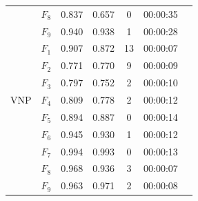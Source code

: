 \documentclass[main.tex]{subfiles}
\begin{document}
\begin{table}
\begin{center}
\begin{tabular}{ |c|c|c|c|c|c|c| }
& $F_{8}$ & 0.837 & 0.657 & 0 & 00:00:35 \\
& $F_{9}$ & 0.940 & 0.938 & 1 & 00:00:28 \\
\hline
\multirow{7}{*}{VNP} 
& $F_{1}$ & 0.907 & 0.872 & 13 & 00:00:07 \\
& $F_{2}$ & 0.771 & 0.770 & 9 & 00:00:09 \\
& $F_{3}$ & 0.797 & 0.752 & 2 & 00:00:10 \\
& $F_{4}$ & 0.809 & 0.778 & 2 & 00:00:12 \\
& $F_{5}$ & 0.894 & 0.887 & 0 & 00:00:14 \\
& $F_{6}$ & 0.945 & 0.930 & 1 & 00:00:12 \\
& $F_{7}$ & 0.994 & 0.993 & 0 & 00:00:13 \\
& $F_{8}$ & 0.968 & 0.936 & 3 & 00:00:07 \\
& $F_{9}$ & 0.963 & 0.971 & 2 & 00:00:08 \\
\hline
\end{tabular}
\end{center}
\end{table}
\fi 
\end{document}
